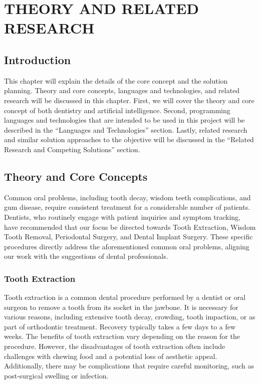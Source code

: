 \documentclass[12pt,oneside,openright,a4paper]{cpe-english-project}
\begin{document}
\chapter{THEORY AND RELATED RESEARCH}
  \section{Introduction}
    \qquad This chapter will explain the details of the core concept and the solution planning. Theory and core concepts, languages and technologies, and related research will be discussed in this chapter. First, we will cover the theory and core concept of both dentistry and artificial intelligence. Second, programming languages and technologies that are intended to be used in this project will be described in the “Languages and Technologies” section. Lastly, related research and similar solution approaches to the objective will be discussed in the “Related Research and Competing Solutions” section.
    
  \section{Theory and Core Concepts}
    \qquad Common oral problems, including tooth decay, wisdom teeth complications, and gum disease, require consistent treatment for a considerable number of patients. Dentists, who routinely engage with patient inquiries and symptom tracking, have recommended that our focus be directed towards Tooth Extraction, Wisdom Tooth Removal, Periodontal Surgery, and Dental Implant Surgery. These specific procedures directly address the aforementioned common oral problems, aligning our work with the suggestions of dental professionals.\par
    \subsection{Tooth Extraction}
      \qquad Tooth extraction is a common dental procedure performed by a dentist or oral surgeon to remove a tooth from its socket in the jawbone. It is necessary for various reasons, including extensive tooth decay, crowding, tooth impaction, or as part of orthodontic treatment. Recovery typically takes a few days to a few weeks. The benefits of tooth extraction vary depending on the reason for the procedure. However, the disadvantages of tooth extraction often include challenges with chewing food and a potential loss of aesthetic appeal. Additionally, there may be complications that require careful monitoring, such as post-surgical swelling or infection.\par
\end{document}
